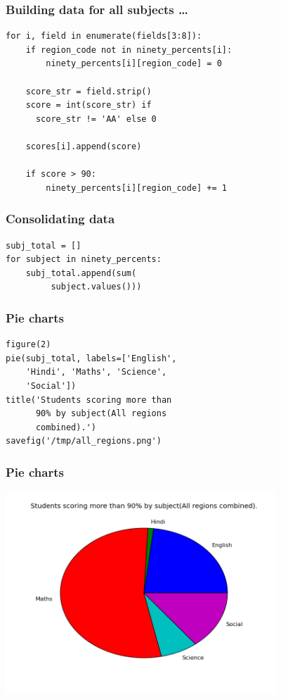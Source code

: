 \documentclass[14pt,compress]{beamer}
\begin{document}
\begin{frame}[fragile]
  \frametitle{Building data for all subjects \ldots}
  \small
  \begin{lstlisting}
for i, field in enumerate(fields[3:8]):
    if region_code not in ninety_percents[i]:
        ninety_percents[i][region_code] = 0

    score_str = field.strip()
    score = int(score_str) if
      score_str != 'AA' else 0

    scores[i].append(score)

    if score > 90:
        ninety_percents[i][region_code] += 1
  \end{lstlisting}
\end{frame}

\begin{frame}[fragile]
  \frametitle{Consolidating data}
  \begin{lstlisting}
subj_total = []
for subject in ninety_percents:
    subj_total.append(sum(
         subject.values()))
  \end{lstlisting}
\end{frame}

\begin{frame}[fragile]
  \frametitle{Pie charts}
  \begin{lstlisting}
figure(2)
pie(subj_total, labels=['English',
    'Hindi', 'Maths', 'Science',
    'Social'])
title('Students scoring more than
      90% by subject(All regions
      combined).')
savefig('/tmp/all_regions.png')
  \end{lstlisting}
\end{frame}

\begin{frame}[fragile]
  \frametitle{Pie charts}
  \includegraphics[height=3in, interpolate=true]{data/all_regions}
\end{frame}
\end{document}

